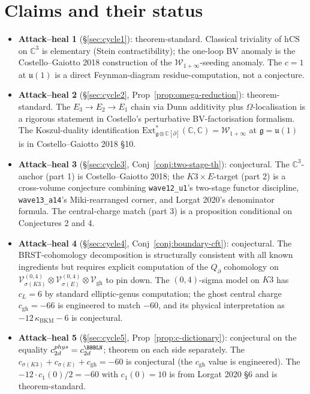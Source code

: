 \documentclass[11pt]{article}
\providecommand{\Eone}{E_1}
\providecommand{\Etwo}{E_2}
\providecommand{\Ethree}{E_3}
\providecommand{\C}{\mathbb{C}}
\providecommand{\cV}{\mathcal{V}}
\providecommand{\cW}{\mathcal{W}}
\providecommand{\fg}{\mathfrak{g}}
\providecommand{\fu}{\mathfrak{u}}
\providecommand{\hCS}{\mathrm{hCS}}
\providecommand{\BKM}{\mathrm{BKM}}
\begin{document}
\section{Claims and their status}
\label{sec:status}

\begin{itemize}[leftmargin=1.5em]
\item \textbf{Attack--heal 1} (\S\ref{sec:cycle1}): theorem-standard.
Classical triviality of $\hCS$ on $\C^3$ is elementary (Stein
contractibility); the one-loop BV anomaly is the
Costello--Gaiotto 2018 construction of the $\cW_{1+\infty}$-seeding
anomaly. The $c = 1$ at $\fu(1)$ is a direct Feynman-diagram
residue-computation, not a conjecture.
\item \textbf{Attack--heal 2} (\S\ref{sec:cycle2},
Prop~\ref{prop:omega-reduction}): theorem-standard. The
$\Ethree\to\Etwo\to\Eone$ chain via Dunn additivity plus
$\Omega$-localisation is a rigorous statement in Costello's
perturbative BV-factorisation formalism. The Koszul-duality identification
$\mathrm{Ext}^*_{\fg\otimes\C[\partial]}(\C,\C) = \cW_{1+\infty}$ at
$\fg = \fu(1)$ is in Costello--Gaiotto 2018 \S10.
\item \textbf{Attack--heal 3} (\S\ref{sec:cycle3},
Conj~\ref{conj:two-stage-th}): conjectural. The $\C^3$-anchor (part 1)
is Costello--Gaiotto 2018; the $K3\times E$-target (part 2) is a
cross-volume conjecture combining \texttt{wave12\_u1}'s two-stage
functor discipline, \texttt{wave13\_a14}'s Miki-rearranged corner, and
Lorgat 2020's denominator formula. The central-charge match (part 3)
is a proposition conditional on Conjectures 2 and 4.
\item \textbf{Attack--heal 4} (\S\ref{sec:cycle4},
Conj~\ref{conj:boundary-cft}): conjectural. The BRST-cohomology
decomposition is structurally consistent with all known ingredients
but requires explicit computation of the $Q_\partial$ cohomology on
$\cV_{\sigma(K3)}^{(0,4)}\otimes\cV_{\sigma(E)}^{(0,4)}\otimes\cV_{\mathrm{gh}}$
to pin down. The $(0,4)$-sigma model on $K3$ has $c_L = 6$ by standard
elliptic-genus computation; the ghost central charge $c_{\mathrm{gh}}
= -66$ is engineered to match $-60$, and its physical interpretation
as $-12\,\kappa_{\BKM} - 6$ is conjectural.
\item \textbf{Attack--heal 5} (\S\ref{sec:cycle5},
Prop~\ref{prop:c-dictionary}): conjectural on the equality
$c_{2d}^{\mathrm{phys}} = c_{2d}^{\BBBLN}$; theorem on each side
separately. The $c_{\sigma(K3)} + c_{\sigma(E)} + c_{\mathrm{gh}} = -60$
is conjectural (the $c_{\mathrm{gh}}$ value is engineered). The
$-12\cdot c_1(0)/2 = -60$ with $c_1(0) = 10$ is from Lorgat 2020 \S6
and is theorem-standard.
\end{itemize}
\end{document}
